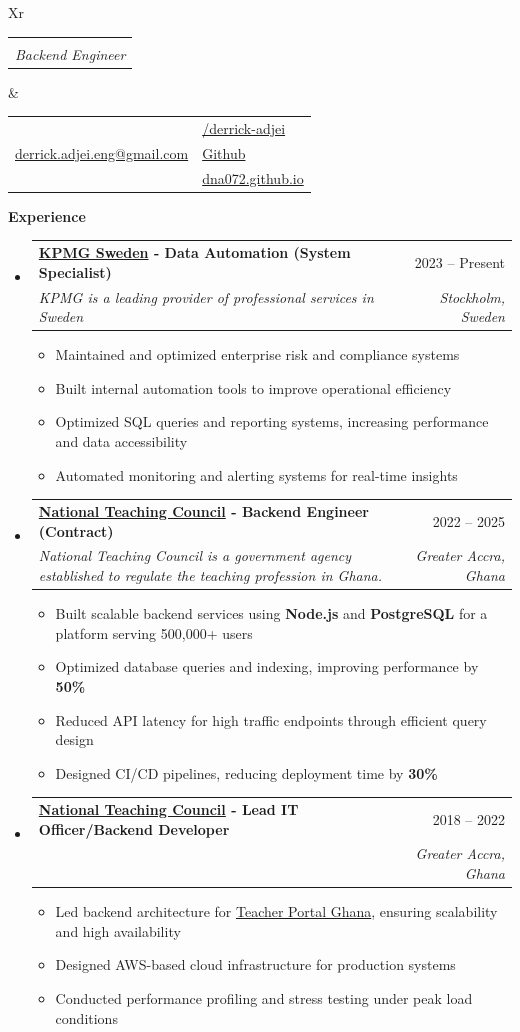 \documentclass[a4paper,12pt]{article}[leftmargin=*]
\makeatletter
\def \fullname {Derrick Adjei}
\def \subtitle {Backend Engineer}
\def \linkedinicon {\faLinkedin}
\def \linkedinlink {https://www.linkedin.com/in/derrick-adjei-5421289a/}
\def \linkedintext {/derrick-adjei}
\def \phoneicon {\faPhone}
\def \phonetext {+46-76-251-7998}
\def \emailicon {\faEnvelope}
\def \emaillink {mailto:derrick.adjei.eng@gmail.com}
\def \emailtext {derrick.adjei.eng@gmail.com}
\def \githubicon {\faGithub}
\def \githublink {https://github.com/Dna072/}
\def \githubtext {Github}
\def \websiteicon {\faGlobe}
\def \websitelink {https://dna072.github.io/}
\def \websitetext {dna072.github.io}
\def \headertype {\doublecol} %
\def \entryspacing {-0pt}
\def \linkedin {\linkedinicon \hspace{3pt}\href{\linkedinlink}{\linkedintext}}
\def \phone {\phoneicon \hspace{3pt}{ \phonetext}}
\def \email {\emailicon \hspace{3pt}\href{\emaillink}{\emailtext}}
\def \github {\githubicon \hspace{3pt}\href{\githublink}{\githubtext}}
\def \website {\websiteicon \hspace{3pt}\href{\websitelink}{\websitetext}}
\renewcommand{\section}[2]{\vspace{5pt}
  \colorbox{secondary}{\color{white}\raggedbottom\normalsize\textbf{{#1}{\hspace{7pt}#2}}}
}
\newcommand{\resumeEntryStart}{\begin{itemize}[leftmargin=2.5mm]}
\newcommand{\resumeEntryEnd}{\end{itemize}\vspace{\entryspacing}}
\newcommand{\resumeItemListStart}{\begin{itemize}[leftmargin=4.5mm]}
\newcommand{\resumeItemListEnd}{\end{itemize}}
\newcommand{\resumeItem}[1]{
  \item\small{
    {#1 \vspace{-2pt}}
  }
}
\newcommand{\resumeEntryTSDL}[4]{
  \vspace{-1pt}\item[]
    \begin{tabularx}{0.99\textwidth}{X@{\hspace{60pt}}r}
      \textbf{\color{primary}#1} & {\firabook\color{accent}\small#2} \\
      \textit{\color{accent}\small#3} & \textit{\color{accent}\small#4} \\
    \end{tabularx}\vspace{-7pt}
}
\newcommand{\doublecol}[6]{
  \begin{tabularx}{\textwidth}{Xr}
    {
      \begin{tabular}[c]{l}
        \fontsize{35}{45}\selectfont{\color{primary}{{\textbf{\fullname}}}} \\
        {\textit{\subtitle}} %
      \end{tabular}
    } & {
      \begin{tabular}[c]{l@{\hspace{1.5em}}l}
        {\small#4} & {\small#1} \\
        {\small#5} & {\small#2} \\
        {\small#6} & {\small#3}
      \end{tabular}
    }
  \end{tabularx}
}
\newcommand{\singlecol}[6]{
  \begin{tabularx}{\textwidth}{Xr}
    {
      \begin{tabular}[b]{l}
        \fontsize{35}{45}\selectfont{\color{primary}{{\textbf{\fullname}}}} \\
        {\textit{\subtitle}} %
      \end{tabular}
    } & {
      \begin{tabular}[c]{l}
        {\small#1} \\
        {\small#2} \\
        {\small#3} \\
        {\small#4} \\
        {\small#5} \\
        {\small#6}
      \end{tabular}
    }
  \end{tabularx}
}
\makeatother
\begin{document}


\headertype{\linkedin}{\github}{\website}{\phone}{\email}{} %
\vspace{-5pt} %

\vspace{5pt}
\section{\faPieChart}{Experience}
  \resumeEntryStart
  \vspace{-10pt}
    \resumeEntryTSDL
      {\href{https://kpmg.se/}{KPMG Sweden} - Data Automation (System Specialist)}{2023 -- Present}
      {KPMG is a leading provider of professional services in Sweden}{Stockholm, Sweden}
    \resumeItemListStart
      \resumeItem {Maintained and optimized enterprise risk and compliance systems}
      \resumeItem {Built internal automation tools to improve operational efficiency}
      \resumeItem {Optimized SQL queries and reporting systems, increasing performance and data accessibility}
      \resumeItem {Automated monitoring and alerting systems for real-time insights}
    \resumeItemListEnd
  \resumeEntryEnd

  \resumeEntryStart
    \vspace{-7pt}
    \resumeEntryTSDL
      {\href{https://ntc.gov.gh/}{National Teaching Council} - Backend Engineer (Contract)}{2022 -- 2025}
      {National Teaching Council is a government agency established to regulate the teaching profession in Ghana.}{Greater Accra, Ghana}
    \resumeItemListStart
      \resumeItem {Built scalable backend services using \textbf{Node.js} and \textbf{PostgreSQL} for a platform serving 500,000+ users}
      \resumeItem {Optimized database queries and indexing, improving performance by \textbf{50\%}}
      \resumeItem {Reduced API latency for high traffic endpoints through efficient query design}
      \resumeItem {Designed CI/CD pipelines, reducing deployment time by \textbf{30\%}}
    \resumeItemListEnd
  \resumeEntryEnd

  \resumeEntryStart
    \vspace{-7pt}
    \resumeEntryTSDL
      {\href{https://ntc.gov.gh/}{National Teaching Council} - Lead IT Officer/Backend Developer}{2018 -- 2022}
      {}{Greater Accra, Ghana}
    \resumeItemListStart
      \resumeItem {Led backend architecture for {\href{https://tpg.ntc.gov.gh}{Teacher Portal Ghana}}, ensuring scalability and high availability}
      \resumeItem {Designed AWS-based cloud infrastructure for production systems}
      \resumeItem {Conducted performance profiling and stress testing under peak load conditions}
    \resumeItemListEnd
  \resumeEntryEnd
\end{document}
